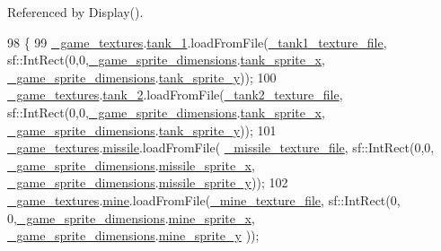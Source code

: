 Referenced by Display().


\begin{DoxyCode}
98 \{
99     \hyperlink{classDisplay_a64ae525710346f1a982efa05b8c53a88}{\_game\_textures}.\hyperlink{structtextures_a9287e247a5d108ed875b7b5b89ded524}{tank\_1}.loadFromFile(\hyperlink{classDisplay_a4055ddd33815347b986bb7437bdc1c79}{\_tank1\_texture\_file}, 
      sf::IntRect(0,0,\hyperlink{classDisplay_acf0a20ec8a01c1917d62f20ddf2d2f51}{\_game\_sprite\_dimensions}.\hyperlink{classSpriteDimensions_a9d7ddd6f707798f86ced573e28f9eea0}{tank\_sprite\_x},
      \hyperlink{classDisplay_acf0a20ec8a01c1917d62f20ddf2d2f51}{\_game\_sprite\_dimensions}.\hyperlink{classSpriteDimensions_abe1930e59ce44b9bdc0e6b363b668f7d}{tank\_sprite\_y}));
100     \hyperlink{classDisplay_a64ae525710346f1a982efa05b8c53a88}{\_game\_textures}.\hyperlink{structtextures_a3322b3f064640afe1a4ebdb53636b71d}{tank\_2}.loadFromFile(\hyperlink{classDisplay_a5ab9e2102af414ee9d1d8d5b090ad9da}{\_tank2\_texture\_file}, 
      sf::IntRect(0,0,\hyperlink{classDisplay_acf0a20ec8a01c1917d62f20ddf2d2f51}{\_game\_sprite\_dimensions}.\hyperlink{classSpriteDimensions_a9d7ddd6f707798f86ced573e28f9eea0}{tank\_sprite\_x},
      \hyperlink{classDisplay_acf0a20ec8a01c1917d62f20ddf2d2f51}{\_game\_sprite\_dimensions}.\hyperlink{classSpriteDimensions_abe1930e59ce44b9bdc0e6b363b668f7d}{tank\_sprite\_y}));
101     \hyperlink{classDisplay_a64ae525710346f1a982efa05b8c53a88}{\_game\_textures}.\hyperlink{structtextures_a1d12557e92da80a9809f037edfe72f2f}{missile}.loadFromFile(
      \hyperlink{classDisplay_a11a966967d1bfa745d910f25da35b6fb}{\_missile\_texture\_file}, sf::IntRect(0,0,
      \hyperlink{classDisplay_acf0a20ec8a01c1917d62f20ddf2d2f51}{\_game\_sprite\_dimensions}.\hyperlink{classSpriteDimensions_a0c406c32caf5ea7841c763100dd83ecf}{missile\_sprite\_x},
      \hyperlink{classDisplay_acf0a20ec8a01c1917d62f20ddf2d2f51}{\_game\_sprite\_dimensions}.\hyperlink{classSpriteDimensions_adcf501d11ae383d24cbbe5b526585f86}{missile\_sprite\_y}));
102     \hyperlink{classDisplay_a64ae525710346f1a982efa05b8c53a88}{\_game\_textures}.\hyperlink{structtextures_a7f5b6643fd47d1bd8d5758c24c32dc9e}{mine}.loadFromFile(\hyperlink{classDisplay_a9b6a965f2d1ca97d9c243d4bbd941994}{\_mine\_texture\_file}, sf::IntRect(0,
      0,\hyperlink{classDisplay_acf0a20ec8a01c1917d62f20ddf2d2f51}{\_game\_sprite\_dimensions}.\hyperlink{classSpriteDimensions_af7f442b00b4a2d9d8b9ad47371a0018f}{mine\_sprite\_x},
      \hyperlink{classDisplay_acf0a20ec8a01c1917d62f20ddf2d2f51}{\_game\_sprite\_dimensions}.\hyperlink{classSpriteDimensions_a256b5245430fc54ae2cace272260dbe1}{mine\_sprite\_y} ));

\end{DoxyCode}
